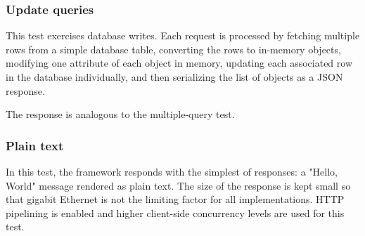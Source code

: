 \subsubsection{Update queries}

This test exercises database writes. Each request is processed by fetching multiple rows from a simple database table, converting the rows to in-memory objects, modifying one attribute of each object in memory, updating each associated row in the database individually, and then serializing the list of objects as a JSON response.

The response is analogous to the multiple-query test.

\subsubsection{Plain text}
In this test, the framework responds with the simplest of responses: a "Hello, World" message rendered as plain text. The size of the response is kept small so that gigabit Ethernet is not the limiting factor for all implementations. HTTP pipelining is enabled and higher client-side concurrency levels are used for this test.

